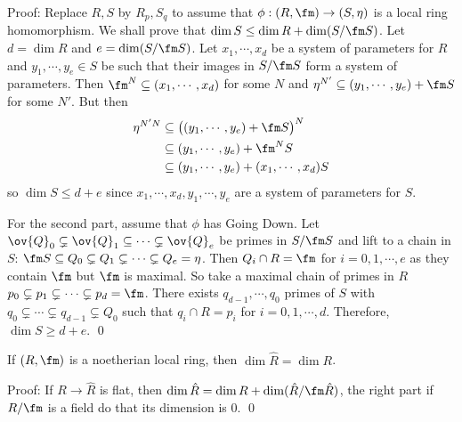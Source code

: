 \noindent Proof: Replace $R,S$ by $R_p,S_q$ to assume that $\phi: (R,\fm) \to (S,\eta)$ is a local ring homomorphism. We shall prove that $\dim S \leq \dim R + \dim (S/\fm S)$. Let $d=\dim R$ and $e=\dim (S/\fm S)$. Let $x_1,\cdots,x_d$ be a system of parameters for $R$ and $y_1,\cdots,y_e \in S$ be such that their images in $S/\fm S$ form a system of parameters. Then $\fm^N \subseteq (x_1,\cdots,x_d)$ for some $N$ and $\eta^{N'} \subseteq (y_1,\cdots,y_e)+\fm S$ for some $N'$. But then 
\[
\begin{split}
\eta^{N'N} &\subseteq \big((y_1,\cdots,y_e)+\fm S\big)^N \\
&\subseteq (y_1,\cdots,y_e)+\fm^NS \\
&\subseteq (y_1,\cdots,y_e) + (x_1,\cdots,x_d)S
\end{split}
\]
so $\dim S \leq d+e$ since $x_1,\cdots,x_d,y_1,\cdots,y_e$ are a system of parameters for $S$.

For the second part, assume that $\phi$ has Going Down. Let $\ov{Q}_0 \subsetneq \ov{Q}_1 \subseteq \cdots \subsetneq \ov{Q}_e$ be primes in $S/\fm S$ and lift to a chain in $S$: $\fm S \subseteq Q_0 \subsetneq Q_1 \subsetneq \cdots \subsetneq Q_e=\eta$. Then $Q_i \cap R=\fm$ for $i=0,1,\cdots,e$ as they contain $\fm$ but $\fm$ is maximal. So take a maximal chain of primes in $R$ $p_0 \subsetneq p_1 \subsetneq \cdots \subsetneq p_d=\fm$. There exists $q_{d-1},\cdots,q_0$ primes of $S$ with $q_0 \subsetneq \cdots \subsetneq q_{d-1} \subsetneq Q_0$ such that $q_i \cap R=p_i$ for $i=0,1,\cdots,d$. Therefore, $\dim S \geq d+e$. \qed \\

\begin{cor}
If $(R,\fm)$ is a noetherian local ring, then $\dim \hat{R}=\dim R$.
\end{cor}

\noindent Proof: If $R \to \hat{R}$ is flat, then $\dim \hat{R}=\dim R+\dim(\hat{R}/\fm \hat{R})$, the right part if $R/\fm$ is a field do that its dimension is 0. \qed \\